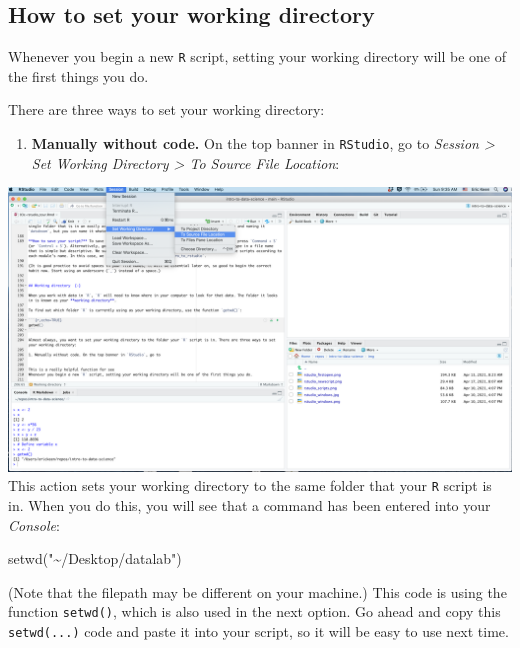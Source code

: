 \documentclass[
]{book}
\newenvironment{Shaded}{\begin{snugshade}}{\end{snugshade}}
\newcommand{\FunctionTok}[1]{\textcolor[rgb]{0.00,0.00,0.00}{#1}}
\newcommand{\NormalTok}[1]{#1}
\newcommand{\StringTok}[1]{\textcolor[rgb]{0.31,0.60,0.02}{#1}}
\providecommand{\tightlist}{%
  \setlength{\itemsep}{0pt}\setlength{\parskip}{0pt}}
\begin{document}
\hypertarget{how-to-set-your-working-directory}{%
\subsection*{How to set your working directory}\label{how-to-set-your-working-directory}}

Whenever you begin a new \texttt{R} script, setting your working directory will be one of the first things you do.

There are three ways to set your working directory:

\begin{enumerate}
\def\labelenumi{\arabic{enumi}.}
\tightlist
\item
  \textbf{Manually without code.} On the top banner in \texttt{RStudio}, go to \emph{Session \textgreater{} Set Working Directory \textgreater{} To Source File Location}:
\end{enumerate}

\includegraphics{img/rstudio_setwd.png}
This action sets your working directory to the same folder that your \texttt{R} script is in. When you do this, you will see that a command has been entered into your \emph{Console}:

\begin{Shaded}
\begin{Highlighting}[]
\FunctionTok{setwd}\NormalTok{(}\StringTok{"\textasciitilde{}/Desktop/datalab"}\NormalTok{)}
\end{Highlighting}
\end{Shaded}

(Note that the filepath may be different on your machine.) This code is using the function \texttt{setwd()}, which is also used in the next option. Go ahead and copy this \texttt{setwd(...)} code and paste it into your script, so it will be easy to use next time.
\end{document}
